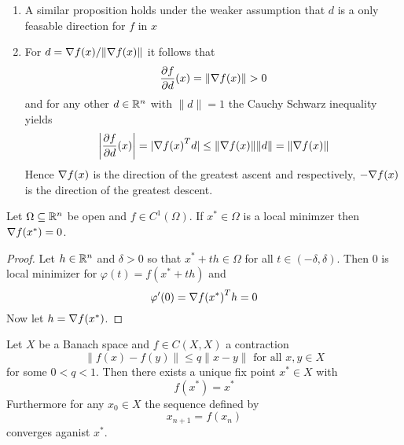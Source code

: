 \begin{remarks}\hfill
    \begin{enumerate}
        \item A similar proposition holds under the weaker assumption that \( d \) is a only feasable direction
              for \( f \) in \( x \)
        \item For \( d = \nabla{f(x)}/\| \nabla{f(x)}\| \) it follows that
              \[
                  \frac{\partial f}{\partial d}(x) = \|\nabla{f(x)}\| > 0
              \]
              and for any other \( d \in \mathbb{R}^n \) with \( \|d\| = 1 \) the Cauchy Schwarz inequality yields
              \[
                  \left|\frac{\partial f}{\partial d}(x)\right| = |\nabla{f(x)}^T d|
                  \le \|\nabla{f(x)}\| \|d\| =\|\nabla{f(x)}\|
              \]
              Hence \( \nabla{f(x)} \) is the direction of the greatest ascent and respectively,
              \( -\nabla{f(x)} \) is the direction of the greatest descent.
    \end{enumerate}
\end{remarks}
\bigskip


\begin{theorem}\label{thm:fonc}
    Let \( \Omega \subseteq \mathbb{R}^n \) be open and \( f \in C^1(\Omega) \). If \( x^* \in \Omega \) is a local minimzer then
    \( \nabla f(x^*) = 0 \).
\end{theorem}

\begin{proof}
    Let \( h \in \mathbb{R}^n \) and \( \delta > 0 \) so that \( x^* + th \in \Omega \) for all \( t \in (-\delta, \delta) \).
    Then \( 0 \) is local minimizer for \( \varphi(t) = f(x^* + th) \) and
    \[
        \varphi'(0) = {\nabla f(x^*)}^T h = 0
    \]
    Now let \( h = \nabla f(x^*) \).
\end{proof}
\bigskip


\begin{theorem}\label{thm:banach_fix_point}
    Let \( X \) be a Banach space and \( f \in C(X,X) \) a contraction
    \[
        \|f(x) - f(y)\| \le q \|x - y\| \text{ for all } x, y \in X
    \]
    for some \( 0 < q < 1 \). Then there exists a unique fix point \( x^* \in X \) with
    \[
        f(x^*) = x^*
    \]
    Furthermore for any \( x_0 \in X \) the sequence defined by
    \[
        x_{n+1} = f(x_n)
    \]
    converges aganist \( x^* \).
\end{theorem}

